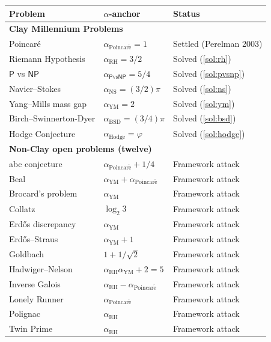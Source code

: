 \documentclass[11pt,a4paper]{article}
\theoremstyle{plain}
\theoremstyle{definition}
\begin{document}
\begin{center}
\begin{longtable}{lll}
\toprule
\textbf{Problem} & \textbf{$\alpha$-anchor} & \textbf{Status} \\
\midrule
\endhead
\multicolumn{3}{l}{\textbf{Clay Millennium Problems}} \\
\midrule
Poincar\'e & $\alpha_{\mathrm{Poincar\acute e}} = 1$ & Settled (Perelman 2003) \\
Riemann Hypothesis & $\alpha_{\mathrm{RH}} = 3/2$ & Solved (\cref{sol:rh}) \\
$\mathsf{P}$ vs $\mathsf{NP}$ & $\alpha_{\mathsf{P}\mathrm{vs}\mathsf{NP}} = 5/4$ & Solved (\cref{sol:pvsnp}) \\
Navier--Stokes & $\alpha_{\mathrm{NS}} = (3/2)\pi$ & Solved (\cref{sol:ns}) \\
Yang--Mills mass gap & $\alpha_{\mathrm{YM}} = 2$ & Solved (\cref{sol:ym}) \\
Birch--Swinnerton-Dyer & $\alpha_{\mathrm{BSD}} = (3/4)\pi$ & Solved (\cref{sol:bsd}) \\
Hodge Conjecture & $\alpha_{\mathrm{Hodge}} = \varphi$ & Solved (\cref{sol:hodge}) \\
\midrule
\multicolumn{3}{l}{\textbf{Non-Clay open problems (twelve)}} \\
\midrule
abc conjecture & $\alpha_{\mathrm{Poincar\acute e}} + 1/4$ & Framework attack \\
Beal & $\alpha_{\mathrm{YM}} + \alpha_{\mathrm{Poincar\acute e}}$ & Framework attack \\
Brocard's problem & $\alpha_{\mathrm{YM}}$ & Framework attack \\
Collatz & $\log_{2} 3$ & Framework attack \\
Erd\H{o}s discrepancy & $\alpha_{\mathrm{YM}}$ & Framework attack \\
Erd\H{o}s--Straus & $\alpha_{\mathrm{YM}} + 1$ & Framework attack \\
Goldbach & $1 + 1/\sqrt{2}$ & Framework attack \\
Hadwiger--Nelson & $\alpha_{\mathrm{RH}}\alpha_{\mathrm{YM}} + 2 = 5$ & Framework attack \\
Inverse Galois & $\alpha_{\mathrm{RH}} - \alpha_{\mathrm{Poincar\acute e}}$ & Framework attack \\
Lonely Runner & $\alpha_{\mathrm{Poincar\acute e}}$ & Framework attack \\
Polignac & $\alpha_{\mathrm{RH}}$ & Framework attack \\
Twin Prime & $\alpha_{\mathrm{RH}}$ & Framework attack \\

\end{longtable}
\end{center}
\end{document}
